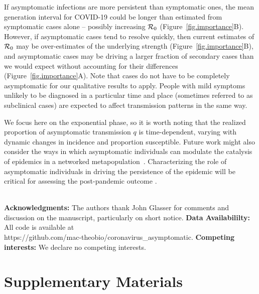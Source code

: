 \documentclass[12pt]{article}
\begin{document}
If asymptomatic infections are more persistent than symptomatic ones, the mean generation interval for COVID-19 could be longer than estimated from symptomatic cases alone -- possibly increasing ${\cal{R}}_0$ (Figure~\ref{fig.importance}B).
However, if asymptomatic cases tend to resolve quickly, then current estimates of ${\cal{R}}_0$ may be over-estimates of the underlying strength (Figure~\ref{fig.importance}B), and asymptomatic cases may be driving a larger fraction of secondary cases than we would expect without accounting for their differences (Figure~\ref{fig.importance}A).
Note that cases do not have to be completely asymptomatic for our qualitative results to apply.
People with mild symptoms unlikely to be diagnosed in a particular time and place (sometimes referred to as subclinical cases) are expected to affect transmission patterns in the same way.

We focus here on the exponential phase, so it is worth noting that the realized proportion of asymptomatic transmission $q$ is time-dependent, varying with dynamic changes in incidence and proportion susceptible. 
Future work might also consider the ways in which asymptomatic individuals can modulate the catalysis of epidemics in a networked metapopulation~\cite{watts_pnas2005, chinazzi2020effect, du2020risk}.
Characterizing the role of asymptomatic individuals in driving the persistence of the epidemic will be critical for assessing the post-pandemic outcome \cite{lipsitch_preprint}.

\mbox{}\\
\noindent
\textbf{Acknowledgments:} The authors thank John Glasser for comments
and discussion on the manuscript, particularly on short notice. 
\newline\newline
\noindent
\textbf{Data Availabililty:} All code is available at\\
https://github.com/mac-theobio/coronavirus\_asymptomatic.
\newline\newline
\noindent
\textbf{Competing interests:} We declare no competing interests.

\pagebreak

\section*{Supplementary Materials}
\renewcommand\thefigure{S\arabic{figure}}
\renewcommand\theequation{S\arabic{equation}}
\setcounter{figure}{0}
\setcounter{equation}{0}
\end{document}
